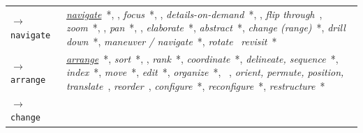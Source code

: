 \begin{table}
\begin{center}
\begin{tabular}{p{}>{\RaggedRight}p{}}
    \\ \rowcolor{gray!10}
    
        {\tt $\rightarrow$ navigate}\index{{\tt navigate}} &
    
        	{\it \underline{navigate}}~\cite{Heer2012,Spence2007,Ward2004}*, \cite{Marchionini2006,Munzner2009a,Plaisant1995,Ware2012,Wilkinson2005},
        	{\it focus}~\cite{Buja1996,Dix1998}*, \cite{Chi1998}, %
        	{\it details-on-demand}~\cite{Card1999,Shneiderman1996}*, \cite{Chi1998},
        	{\it flip through}~\cite{Chi1998},
        	{\it zoom}~\cite{Buja1996,Card1999,Dix1998,Gotz2008,Keim2002,Mullins1993,Pike2009,Roth2012,Roth2013,Shneiderman1996,Yi2007}*, \cite{Chi1998,Munzner2009a,Wilkinson2005},
        	{\it pan}~\cite{Buja1996,Gotz2008,Mullins1993,Pike2009,Roth2012,Roth2013,Yi2007}*, \cite{Wilkinson2005},
        	{\it elaborate}~\cite{Pike2009,Yi2007}*,
        	{\it abstract}~\cite{Pike2009,Yi2007}*, %
        	{\it change (range)}~\cite{Gotz2008}*,
        	{\it drill down}~\cite{Dix1998}*,
        	{\it maneuver / navigate}~\cite{Springmeyer1992}*,
        	{\it rotate}~\cite{Chi1998,Wilkinson2005}
        	{\it revisit}~\cite{Gotz2008,Lee2006}*
    
	\\
    
        {\tt $\rightarrow$ arrange}\index{{\tt arrange}} &
    
        	{\it \underline{arrange}}~\cite{Buja1996,Roth2012,Roth2013}*,
        	{\it sort}~\cite{Amar2005,Gotz2008,Heer2012,Lee2006,Pike2009}*, \cite{Munzner2009a},
        	{\it rank}~\cite{Roth2012,Roth2013,Wehrend1990,Zhou1998}*,
        	{\it coordinate}~\cite{Heer2012}*,
        	{\it delineate, sequence}~\cite{Roth2012,Roth2013}*,
        	{\it index}~\cite{Roth1990}*,
        	{\it move}~\cite{Mullins1993,Raskin2000}*,
        	{\it edit}~\cite{Mullins1993}*, %
        	{\it organize}~\cite{Heer2012}*, ~\cite{Shrinivasan2008}, %
        	{\it orient, permute, position, translate}~\cite{Chi1998},
        	{\it reorder}~\cite{Card1999,Wilkinson2005},
        	{\it configure}~\cite{Valiati2006}*,
        	{\it reconfigure}~\cite{Pike2009,Yi2007}*,
        	{\it restructure}~\cite{Liu2010}*
    
    \\ \rowcolor{gray!10}
    
        {\tt $\rightarrow$ change}\index{{\tt change}} &
    

\end{tabular}
\end{center}
\end{table}

